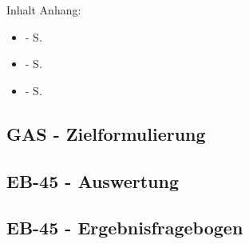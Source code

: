 \appendixpage
\addappheadtotoc
Inhalt Anhang:
\begin{itemize}
	\item {} - S. \pageref{app:gas}
	\item {} - S. \pageref{app:eb45auswertung}
	\item {} - S. \pageref{app:eb45}
\end{itemize}

\newpage
\subsection{GAS - Zielformulierung} \label{app:gas}


\label{app:gasziel}
    
\newpage
\subsection{EB-45 - Auswertung} \label{app:eb45auswertung}

\label{app:eb45}

\newpage
\subsection{EB-45 - Ergebnisfragebogen} \label{app:eb45}

\label{app:eb45}


